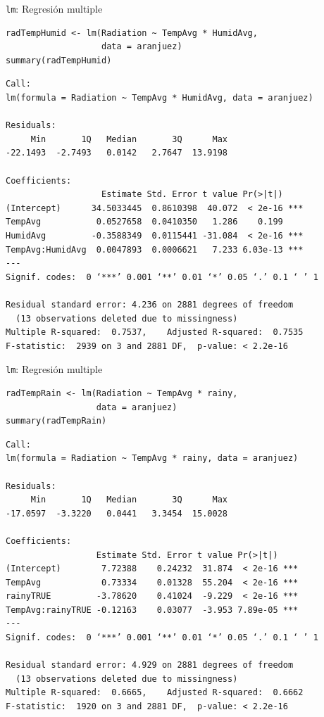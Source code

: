 \documentclass[xcolor={usenames,svgnames,dvipsnames}]{beamer}
\begin{document}
\begin{frame}[fragile,label=sec-5-4-2]{\texttt{lm}: Regresión multiple}
 \lstset{language=R,label= ,caption= ,numbers=none}
\begin{lstlisting}
radTempHumid <- lm(Radiation ~ TempAvg * HumidAvg,
                   data = aranjuez)
summary(radTempHumid)
\end{lstlisting}

\begin{verbatim}
Call:
lm(formula = Radiation ~ TempAvg * HumidAvg, data = aranjuez)

Residuals:
     Min       1Q   Median       3Q      Max 
-22.1493  -2.7493   0.0142   2.7647  13.9198 

Coefficients:
                   Estimate Std. Error t value Pr(>|t|)    
(Intercept)      34.5033445  0.8610398  40.072  < 2e-16 ***
TempAvg           0.0527658  0.0410350   1.286    0.199    
HumidAvg         -0.3588349  0.0115441 -31.084  < 2e-16 ***
TempAvg:HumidAvg  0.0047893  0.0006621   7.233 6.03e-13 ***
---
Signif. codes:  0 ‘***’ 0.001 ‘**’ 0.01 ‘*’ 0.05 ‘.’ 0.1 ‘ ’ 1

Residual standard error: 4.236 on 2881 degrees of freedom
  (13 observations deleted due to missingness)
Multiple R-squared:  0.7537,	Adjusted R-squared:  0.7535 
F-statistic:  2939 on 3 and 2881 DF,  p-value: < 2.2e-16
\end{verbatim}
\end{frame}

\begin{frame}[fragile,label=sec-5-4-3]{\texttt{lm}: Regresión multiple}
 \lstset{language=R,label= ,caption= ,numbers=none}
\begin{lstlisting}
radTempRain <- lm(Radiation ~ TempAvg * rainy,
                  data = aranjuez)
summary(radTempRain)
\end{lstlisting}

\begin{verbatim}
Call:
lm(formula = Radiation ~ TempAvg * rainy, data = aranjuez)

Residuals:
     Min       1Q   Median       3Q      Max 
-17.0597  -3.3220   0.0441   3.3454  15.0028 

Coefficients:
                  Estimate Std. Error t value Pr(>|t|)    
(Intercept)        7.72388    0.24232  31.874  < 2e-16 ***
TempAvg            0.73334    0.01328  55.204  < 2e-16 ***
rainyTRUE         -3.78620    0.41024  -9.229  < 2e-16 ***
TempAvg:rainyTRUE -0.12163    0.03077  -3.953 7.89e-05 ***
---
Signif. codes:  0 ‘***’ 0.001 ‘**’ 0.01 ‘*’ 0.05 ‘.’ 0.1 ‘ ’ 1

Residual standard error: 4.929 on 2881 degrees of freedom
  (13 observations deleted due to missingness)
Multiple R-squared:  0.6665,	Adjusted R-squared:  0.6662 
F-statistic:  1920 on 3 and 2881 DF,  p-value: < 2.2e-16
\end{verbatim}
\end{frame}
\end{document}
